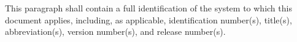 This paragraph shall contain a full identification of the system to which this document applies, including, as applicable, 
identification number(s), title(s), abbreviation(s), version number(s), and release number(s).